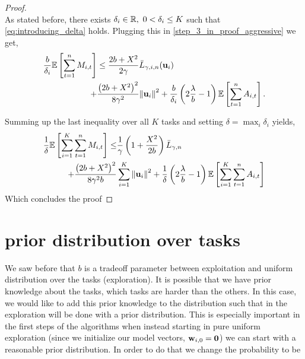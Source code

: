 {\begin{proof}
\begin{equation}
\end{equation}
As stated before, there exists $\delta_i\in\mathbb{R},~ 0<\delta_i\le K$ such that \eqref{eq:introducing_delta}
holds.
Plugging this in \eqref{step_3_in_proof_aggressive} we get,
\begin{equation}\label{eq:bound_for_i_aggressive}
\begin{split}
\frac{b}{\delta_i}\mathbb{E}\left[{\sum_{t=1}^{n}{M_{i,t}}}\right]
&\le \frac{2b+X^2}{2\gamma}{\bar L}_{\gamma,i,n}(\mathbf{u}_{i})\\
+&\frac{\left({2b+X^2}\right)^2}{8{\gamma}^2}{\left\Vert \mathbf{u}_{i} \right\Vert}^2+ 
     \frac{b}{\delta_i}\left({2\frac{\lambda}{b}-1}\right)\mathbb{E}\left[{\sum_{t=1}^{n}{A_{i,t}}}\right].
\end{split}
\end{equation}

Summing up the last inequality over all $K$ tasks and setting $\delta
= \max_i \delta_i$ yields,
\begin{equation*}
\begin{split}
\frac{1}{\delta}\mathbb{E}\left[ \sum_{i=1}^{K}\sum_{t=1}^{n}{M_{i,t}} \right]
\le&\frac{1}{\gamma}\left(1+\frac{X^2}{2b} \right){\bar L}_{\gamma,n}\\
+\frac{\left({2b+X^2}\right)^2}{8{\gamma}^2b}&\sum_{i=1}^{K}{{\left\Vert \mathbf{u}_{i} \right\Vert}^2}+ \frac{1}{\delta}\left({2\frac{\lambda}{b}-1}\right)\mathbb{E}\left[{\sum_{i=1}^{K}\sum_{t=1}^{n}{A_{i,t}}}\right]
\end{split}
\end{equation*}
Which concludes the proof
\QED
\end{proof}

\section{prior distribution over tasks}

We saw before that $b$ is a tradeoff parameter between  exploitation and uniform  distribution over the 
tasks (exploration). It is possible that we have prior knowledge about the tasks, which tasks are harder than 
the others. In this case, we would like to add this prior knowledge to the distribution such that in the 
exploration will be done with  a prior distribution. This is especially important in the first steps of the 
algorithms when instead starting in pure uniform exploration (since we initialize our model vectors, $\mathbf{w}_{i,0}={\boldsymbol{0}}$)  
we can start with a reasonable prior distribution.
In order to do that we change the probability to be 

}
